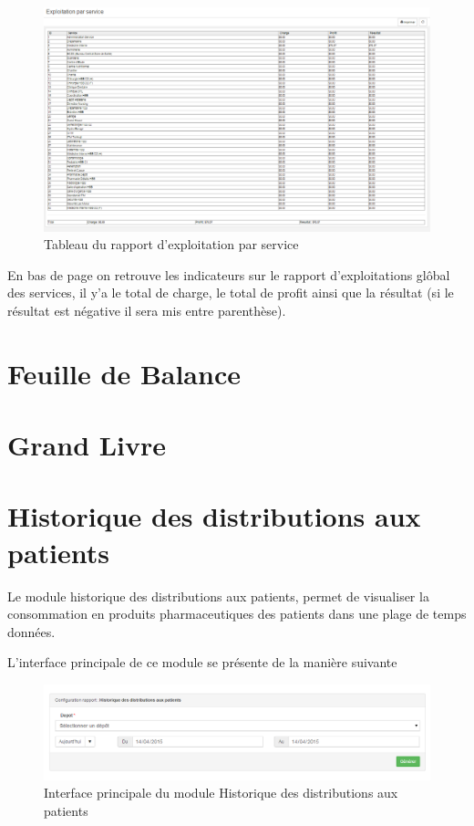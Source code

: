 \documentclass[12pt,a4paper]{report}
\begin{document}
\begin{figure}[h]
\begin{center}
\includegraphics[width=14cm]{pic/ExploiService.png}
\end{center}
\caption{Tableau du rapport d'exploitation par service}
\label{Tableau du rapport d'exploitation par service}
\end{figure}


En bas de page on retrouve les indicateurs sur le rapport d'exploitations glôbal des services, il y'a le total de charge, le total de profit ainsi que la résultat (si le résultat est négative il sera mis entre parenthèse). 

\newpage
\section{Feuille de Balance}

\newpage
\section{Grand Livre}

\newpage
\section{Historique des distributions aux patients}
Le module historique des distributions aux patients, permet de visualiser la consommation en produits pharmaceutiques des patients dans une plage de temps données.

L'interface principale de ce module se présente de la manière suivante

\begin{figure}[h]
\begin{center}
\includegraphics[width=14cm]{pic/HistDistrPatient.png}
\end{center}
\caption{Interface principale du module Historique des distributions aux patients}
\label{Interface principale du module Historique des distributions aux patients}
\end{figure}
\end{document}
